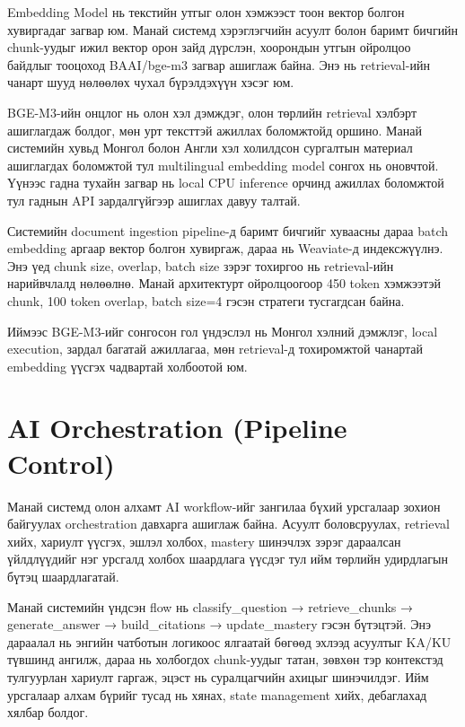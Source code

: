\documentclass[12pt,A4]{report}
\newcommand{\eng}[1]{#1}
\begin{document}
\eng{Embedding Model} нь текстийн утгыг олон хэмжээст тоон вектор болгон хувиргадаг загвар юм. Манай системд хэрэглэгчийн асуулт болон баримт бичгийн \eng{chunk}-уудыг ижил вектор орон зайд дүрслэн, хоорондын утгын ойролцоо байдлыг тооцоход \eng{BAAI/bge-m3} загвар ашиглаж байна. Энэ нь retrieval-ийн чанарт шууд нөлөөлөх чухал бүрэлдэхүүн хэсэг юм.

\eng{BGE-M3}-ийн онцлог нь олон хэл дэмждэг, олон төрлийн retrieval хэлбэрт ашиглагдаж болдог, мөн урт тексттэй ажиллах боломжтойд оршино. Манай системийн хувьд Монгол болон Англи хэл холилдсон сургалтын материал ашиглагдах боломжтой тул \eng{multilingual embedding model} сонгох нь оновчтой. Үүнээс гадна тухайн загвар нь \eng{local CPU inference} орчинд ажиллах боломжтой тул гаднын API зардалгүйгээр ашиглах давуу талтай.

Системийн \eng{document ingestion pipeline}-д баримт бичгийг хуваасны дараа \eng{batch embedding} аргаар вектор болгон хувиргаж, дараа нь \eng{Weaviate}-д индексжүүлнэ. Энэ үед \eng{chunk size}, \eng{overlap}, \eng{batch size} зэрэг тохиргоо нь retrieval-ийн нарийвчлалд нөлөөлнө. Манай архитектурт ойролцоогоор 450 \eng{token} хэмжээтэй \eng{chunk}, 100 \eng{token overlap}, \eng{batch size}=4 гэсэн стратеги тусгагдсан байна.

Иймээс \eng{BGE-M3}-ийг сонгосон гол үндэслэл нь Монгол хэлний дэмжлэг, \eng{local execution}, зардал багатай ажиллагаа, мөн retrieval-д тохиромжтой чанартай \eng{embedding} үүсгэх чадвартай холбоотой юм.


\section{AI Orchestration (Pipeline Control)}

Манай системд олон алхамт \eng{AI workflow}-ийг зангилаа бүхий урсгалаар зохион байгуулах \eng{orchestration} давхарга ашиглаж байна. Асуулт боловсруулах, retrieval хийх, хариулт үүсгэх, эшлэл холбох, mastery шинэчлэх зэрэг дараалсан үйлдлүүдийг нэг урсгалд холбох шаардлага үүсдэг тул ийм төрлийн удирдлагын бүтэц шаардлагатай.

Манай системийн үндсэн \eng{flow} нь \eng{classify\_question → retrieve\_chunks → generate\_answer → build\_citations → update\_mastery} гэсэн бүтэцтэй. Энэ дараалал нь энгийн чатботын логикоос ялгаатай бөгөөд эхлээд асуултыг \eng{KA/KU} түвшинд ангилж, дараа нь холбогдох \eng{chunk}-уудыг татан, зөвхөн тэр контекстэд тулгуурлан хариулт гаргаж, эцэст нь суралцагчийн ахицыг шинэчилдэг. Ийм урсгалаар алхам бүрийг тусад нь хянах, \eng{state management} хийх, дебаглахад хялбар болдог.
\end{document}
